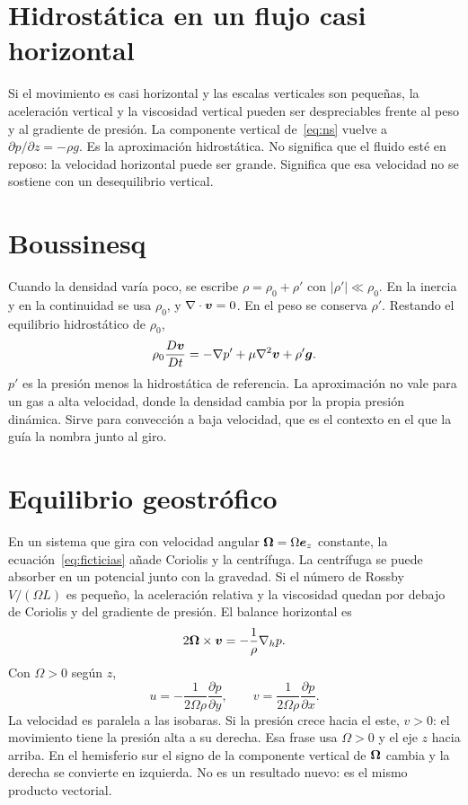 \section{Hidrostática en un flujo casi horizontal}

Si el movimiento es casi horizontal y las escalas verticales son pequeñas, la aceleración vertical y la viscosidad vertical pueden ser despreciables frente al peso y al gradiente de presión. La componente vertical de~\eqref{eq:ns} vuelve a \(\partial p/\partial z=-\rho g\). Es la aproximación hidrostática. No significa que el fluido esté en reposo: la velocidad horizontal puede ser grande. Significa que esa velocidad no se sostiene con un desequilibrio vertical.

\section{Boussinesq}

Cuando la densidad varía poco, se escribe \(\rho=\rho_0+\rho'\) con \(|\rho'|\ll\rho_0\). En la inercia y en la continuidad se usa \(\rho_0\), y \(\nabla\cdot\boldsymbol{v}=0\). En el peso se conserva \(\rho'\). Restando el equilibrio hidrostático de \(\rho_0\),
\begin{equation}
\label{eq:boussinesq}
\rho_0\frac{D\boldsymbol{v}}{Dt}=-\nabla p'+\mu\nabla^2\boldsymbol{v}+\rho'\boldsymbol{g}.
\end{equation}
 \(p'\) es la presión menos la hidrostática de referencia. La aproximación no vale para un gas a alta velocidad, donde la densidad cambia por la propia presión dinámica. Sirve para convección a baja velocidad, que es el contexto en el que la guía la nombra junto al giro.

\section{Equilibrio geostrófico}

En un sistema que gira con velocidad angular \(\boldsymbol{\Omega}=\Omega\boldsymbol{e}_z\) constante, la ecuación~\eqref{eq:ficticias} añade Coriolis y la centrífuga. La centrífuga se puede absorber en un potencial junto con la gravedad. Si el número de Rossby \(V/(\Omega L)\) es pequeño, la aceleración relativa y la viscosidad quedan por debajo de Coriolis y del gradiente de presión. El balance horizontal es
\begin{equation}
\label{eq:geostrofico}
2\boldsymbol{\Omega}\times\boldsymbol{v}=-\frac{1}{\rho}\nabla_h p.
\end{equation}
Con \(\Omega>0\) según \(z\),
\begin{equation}
\label{eq:geostrofico-comp}
u=-\frac{1}{2\Omega\rho}\frac{\partial p}{\partial y},
\qquad
v=\frac{1}{2\Omega\rho}\frac{\partial p}{\partial x}.
\end{equation}
 La velocidad es paralela a las isobaras. Si la presión crece hacia el este, \(v>0\): el movimiento tiene la presión alta a su derecha. Esa frase usa \(\Omega>0\) y el eje \(z\) hacia arriba. En el hemisferio sur el signo de la componente vertical de \(\boldsymbol{\Omega}\) cambia y la derecha se convierte en izquierda. No es un resultado nuevo: es el mismo producto vectorial.


